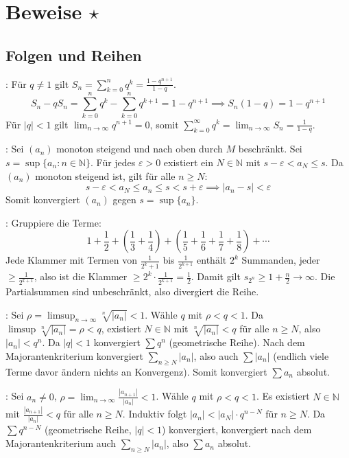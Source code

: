 \section{Beweise \texorpdfstring{$\star$}{*}}

\subsection{Folgen und Reihen}

\Bew {}: Für $q \neq 1$ gilt $S_n = \sum_{k=0}^n q^k = \frac{1 - q^{n+1}}{1 - q}$. 
$$S_n - q S_n = \sum_{k=0}^n q^k - \sum_{k=0}^n q^{k+1} = 1 - q^{n+1} \implies S_n(1 - q) = 1 - q^{n+1}$$
Für $|q| < 1$ gilt $\lim_{n\to\infty} q^{n+1} = 0$, somit $\sum_{k=0}^\infty q^k = \lim_{n\to\infty} S_n = \frac{1}{1 - q}$.

\Bew {}: Sei $(a_n)$ monoton steigend und nach oben durch $M$ beschränkt. Sei $s = \sup\{a_n : n \in \mathbb{N}\}$. 
Für jedes $\varepsilon > 0$ existiert ein $N \in \mathbb{N}$ mit $s - \varepsilon < a_N \le s$. 
Da $(a_n)$ monoton steigend ist, gilt für alle $n \ge N$:
$$s - \varepsilon < a_N \le a_n \le s < s + \varepsilon \implies |a_n - s| < \varepsilon$$
Somit konvergiert $(a_n)$ gegen $s = \sup \{a_n\}$.

\Bew {}: Gruppiere die Terme:
$$1 + \frac{1}{2} + \left(\frac{1}{3}+\frac{1}{4}\right) + \left(\frac{1}{5}+\frac{1}{6}+\frac{1}{7}+\frac{1}{8}\right) + \cdots$$
Jede Klammer mit Termen von $\frac{1}{2^k+1}$ bis $\frac{1}{2^{k+1}}$ enthält $2^k$ Summanden, jeder $\ge \frac{1}{2^{k+1}}$,
also ist die Klammer $\ge 2^k \cdot \frac{1}{2^{k+1}} = \frac{1}{2}$.
Damit gilt $s_{2^n} \ge 1 + \frac{n}{2} \to \infty$. Die Partialsummen sind unbeschränkt, also divergiert die Reihe.

\Bew {}: Sei $\rho = \limsup_{n\to\infty} \sqrt[n]{|a_n|} < 1$. Wähle $q$ mit $\rho < q < 1$.
Da $\limsup \sqrt[n]{|a_n|} = \rho < q$, existiert $N \in \mathbb{N}$ mit $\sqrt[n]{|a_n|} < q$ für alle $n \ge N$, also $|a_n| < q^n$.
Da $|q| < 1$ konvergiert $\sum q^n$ (geometrische Reihe). Nach dem Majorantenkriterium konvergiert $\sum_{n \ge N} |a_n|$,
also auch $\sum |a_n|$ (endlich viele Terme davor ändern nichts an Konvergenz). Somit konvergiert $\sum a_n$ absolut.

\Bew {}: Sei $a_n \neq 0$, $\rho = \lim_{n\to\infty} \frac{|a_{n+1}|}{|a_n|} < 1$. Wähle $q$ mit $\rho < q < 1$.
Es existiert $N \in \mathbb{N}$ mit $\frac{|a_{n+1}|}{|a_n|} < q$ für alle $n \ge N$.
Induktiv folgt $|a_n| < |a_N| \cdot q^{n-N}$ für $n \ge N$.
Da $\sum q^{n-N}$ (geometrische Reihe, $|q|<1$) konvergiert, konvergiert nach dem Majorantenkriterium auch $\sum_{n \ge N} |a_n|$,
also $\sum a_n$ absolut.


